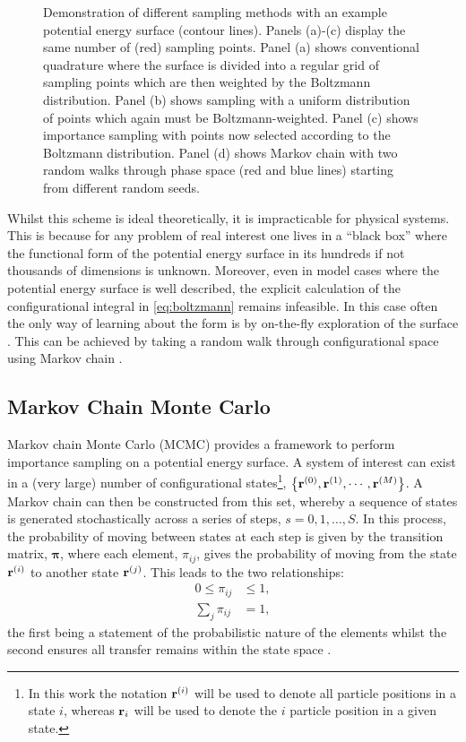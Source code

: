 \begin{figure}[btp]
     \caption{Demonstration of different sampling methods with an example \td{} potential energy surface (contour lines). Panels (a)\--(c) display the same number of (red) sampling points. Panel (a) shows conventional quadrature where the surface is divided into a regular grid of sampling points which are then weighted by the Boltzmann distribution. Panel (b) shows \mc{} sampling with a uniform distribution of points which again must be Boltzmann\--weighted. Panel (c) shows \mc{} importance sampling with points now selected according to the Boltzmann distribution. Panel (d) shows Markov chain \mc{} with two random walks through phase space (red and blue lines) starting from different random seeds.}
     \label{fig:montecarloint}
\end{figure}

Whilst this scheme is ideal theoretically, it is impracticable for physical systems.
This is because for any problem of real interest one lives in a ``black box'' where the functional form of the potential energy surface in its hundreds if not thousands of dimensions is unknown.
Moreover, even in model cases where the potential energy surface is well described, the explicit calculation of the configurational integral in \eqref{eq:boltzmann} remains infeasible. 
In this case often the only way of learning about the form is by on\--the\--fly exploration of the surface \cite{Brooks2011}.
This can be achieved by taking a random walk through configurational space using Markov chain \mc.

\subsection{Markov Chain Monte Carlo}

Markov chain Monte Carlo (MCMC) provides a framework to perform importance sampling on a potential energy surface.
A system of interest can exist in a (very large) number of configurational states\footnote{In this work the notation $\mathbf{r}^{\left(i\right)}$ will be used to denote all particle positions in a state $i$, whereas $\mathbf{r}_{i}$ will be used to denote the $i$\th{} particle position in a given state.}, $\left\{\mathbf{r}^{\left(0\right)},\mathbf{r}^{\left(1\right)},\cdots,\mathbf{r}^{\left(M\right)}\right\}$.
A Markov chain can then be constructed from this set, whereby a sequence of states is generated stochastically across a series of steps, $s=0,1,\dots,S$.
In this process, the probability of moving between states at each step is given by the transition matrix, $\bm{\pi}$, where each element, $\pi_{ij}$, gives the probability of moving from the state $\mathbf{r}^{\left(i\right)}$ to another state $\mathbf{r}^{\left(j\right)}$.  
This leads to the two relationships:
\begin{align}
	0\leq \pi_{ij} &\leq 1, \\
	\sum_{j} \pi_{ij} &= 1, \label{eq:tmrowsum}
\end{align}
the first being a statement of the probabilistic nature of the elements whilst the second ensures all transfer remains within the state space \cite{Frenkel2002,Allen2017,Brooks2011}.

